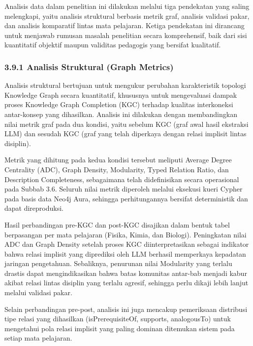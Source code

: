 \documentclass[
]{article}
\begin{document}
Analisis data dalam penelitian ini dilakukan melalui tiga pendekatan
yang saling melengkapi, yaitu analisis struktural berbasis metrik graf,
analisis validasi pakar, dan analisis komparatif lintas mata pelajaran.
Ketiga pendekatan ini dirancang untuk menjawab rumusan masalah
penelitian secara komprehensif, baik dari sisi kuantitatif objektif
maupun validitas pedagogis yang bersifat kualitatif.

\hypertarget{analisis-struktural-graph-metrics}{%
\subsubsection{3.9.1 Analisis Struktural (Graph
Metrics)}\label{analisis-struktural-graph-metrics}}

Analisis struktural bertujuan untuk mengukur perubahan karakteristik
topologi Knowledge Graph secara kuantitatif, khususnya untuk
mengevaluasi dampak proses Knowledge Graph Completion (KGC) terhadap
kualitas interkoneksi antar-konsep yang dihasilkan. Analisis ini
dilakukan dengan membandingkan nilai metrik graf pada dua kondisi, yaitu
sebelum KGC (graf awal hasil ekstraksi LLM) dan sesudah KGC (graf yang
telah diperkaya dengan relasi implisit lintas disiplin).

Metrik yang dihitung pada kedua kondisi tersebut meliputi Average Degree
Centrality (ADC), Graph Density, Modularity, Typed Relation Ratio, dan
Description Completeness, sebagaimana telah didefinisikan secara
operasional pada Subbab 3.6. Seluruh nilai metrik diperoleh melalui
eksekusi kueri Cypher pada basis data Neo4j Aura, sehingga
perhitungannya bersifat deterministik dan dapat direproduksi.

Hasil perbandingan pre-KGC dan post-KGC disajikan dalam bentuk tabel
berpasangan per mata pelajaran (Fisika, Kimia, dan Biologi). Peningkatan
nilai ADC dan Graph Density setelah proses KGC diinterpretasikan sebagai
indikator bahwa relasi implisit yang diprediksi oleh LLM berhasil
memperkaya kepadatan jaringan pengetahuan. Sebaliknya, penurunan nilai
Modularity yang terlalu drastis dapat mengindikasikan bahwa batas
komunitas antar-bab menjadi kabur akibat relasi lintas disiplin yang
terlalu agresif, sehingga perlu dikaji lebih lanjut melalui validasi
pakar.

Selain perbandingan pre-post, analisis ini juga mencakup pemeriksaan
distribusi tipe relasi yang dihasilkan (isPrerequisiteOf, supports,
analogousTo) untuk mengetahui pola relasi implisit yang paling dominan
ditemukan sistem pada setiap mata pelajaran.
\end{document}
